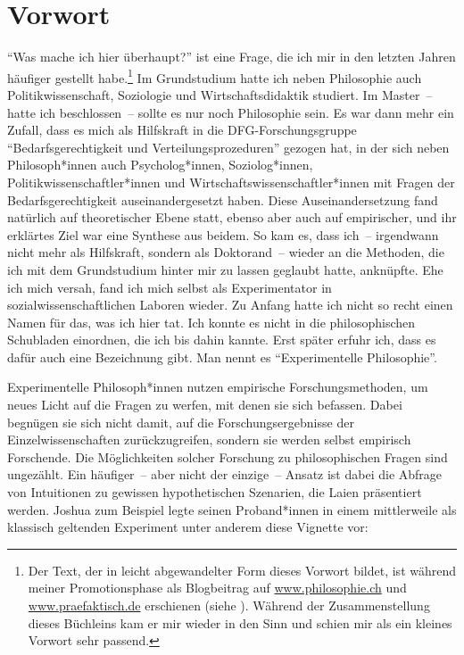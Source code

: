 \documentclass[justified,nobib,nohyper,symmetric,twoside]{tufte-book}
\begin{document}
\cleardoublepage
\chapter*{Vorwort}\label{ch:vorwort}
\enquote{Was mache ich hier überhaupt?} ist eine Frage, die ich mir in den letzten Jahren häufiger gestellt habe.\footnote{Der Text, der in leicht abgewandelter Form dieses Vorwort bildet, ist während meiner Promotionsphase als Blogbeitrag auf \href{https://www.philosophie.ch/2020-06-08-bauer}{www.philosophie.ch} und \href{https://www.praefaktisch.de/experimentelle-philosophie/was-mache-ich-hier-ueberhaupt-experimentelle-philosophie-zwischen-lehnstuhl-und-labor/}{www.praefaktisch.de} erschienen (siehe \citealt{bauer_was_2020_a,bauer_was_2020_b}). Während der Zusammenstellung dieses Büchleins kam er mir wieder in den Sinn und schien mir als ein kleines Vorwort sehr passend.}
Im Grundstudium hatte ich neben Philosophie auch Politikwissenschaft, Soziologie und Wirtschaftsdidaktik studiert.
Im Master~-- hatte ich beschlossen~-- sollte es nur noch Philosophie sein.
Es war dann mehr ein Zufall, dass es mich als Hilfskraft in die DFG-Forschungsgruppe \enquote{Bedarfsgerechtigkeit und Verteilungsprozeduren} gezogen hat, in der sich neben Philosoph*innen auch Psycholog*innen, Soziolog*innen, Politikwissenschaftler*innen und Wirtschaftswissenschaftler*innen mit Fragen der Bedarfsgerechtigkeit auseinandergesetzt haben.
Diese Auseinandersetzung fand natürlich auf theoretischer Ebene statt, ebenso aber auch auf empirischer, und ihr erklärtes Ziel war eine Synthese aus beidem.
So kam es, dass ich~-- irgendwann nicht mehr als Hilfskraft, sondern als Doktorand~-- wieder an die Methoden, die ich mit dem Grundstudium hinter mir zu lassen geglaubt hatte, anknüpfte.
Ehe ich mich versah, fand ich mich selbst als Experimentator in sozialwissenschaftlichen Laboren wieder.
Zu Anfang hatte ich nicht so recht einen Namen für das, was ich hier tat.
Ich konnte es nicht in die philosophischen Schubladen einordnen, die ich bis dahin kannte.
Erst später erfuhr ich, dass es dafür auch eine Bezeichnung gibt.
Man nennt es \enquote{Experimentelle Philosophie}.

Experimentelle Philosoph*innen nutzen empirische Forschungs\-methoden, um neues Licht auf die Fragen zu werfen, mit denen sie sich befassen.
Dabei begnügen sie sich nicht damit, auf die Forschungsergebnisse der Einzelwissenschaften zurückzugreifen, sondern sie werden selbst empirisch Forschende.
Die Möglichkeiten solcher Forschung zu philosophischen Fragen sind ungezählt.
Ein häufiger~-- aber nicht der einzige~-- Ansatz ist dabei die Abfrage von Intuitionen zu gewissen hypothetischen Szenarien, die Laien präsentiert werden.
Jo\-shua \citet{knobe_intentional_2003} zum Beispiel legte seinen Proband*innen in einem mittlerweile als klassisch geltenden Experiment unter anderem diese Vignette vor:
\end{document}
